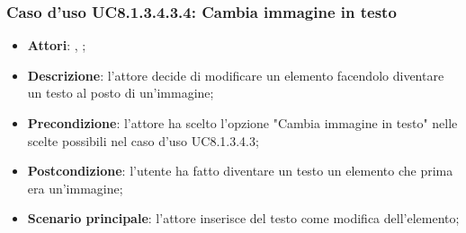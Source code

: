 		\subsubsection{Caso d'uso UC8.1.3.4.3.4: Cambia immagine in testo}
		\label{UC8.1.3.4.3.4}
		\begin{itemize}
			\item \textbf{Attori}: \uau, \uaupro;
			\item \textbf{Descrizione}: l'attore decide di modificare un elemento facendolo diventare un testo al posto di un'immagine;
			\item \textbf{Precondizione}: l'attore ha scelto l'opzione "Cambia immagine in testo" nelle scelte possibili nel caso d'uso UC8.1.3.4.3;
			\item \textbf{Postcondizione}: l'utente ha fatto diventare un testo un elemento che prima era un'immagine;
			\item \textbf{Scenario principale}: l'attore inserisce del testo come modifica dell'elemento;  
		\end{itemize}
